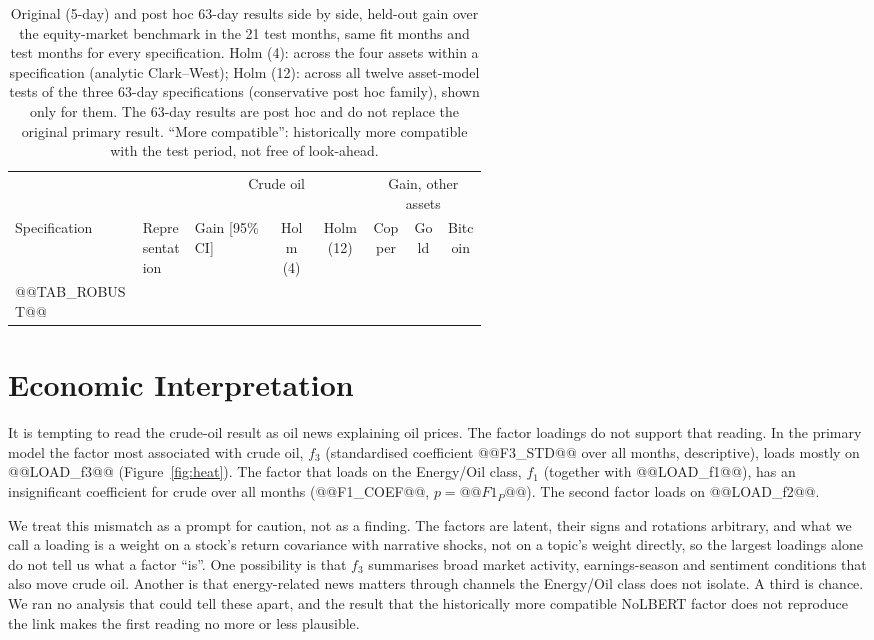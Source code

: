 \documentclass[11pt]{article}
\begin{document}
\begin{table}[t]
\centering\footnotesize
\begin{tabular}{@{}p{0.27\linewidth}p{0.11\linewidth}p{0.17\linewidth}ccccc@{}}
\toprule
 & & \multicolumn{3}{c}{Crude oil} & \multicolumn{3}{c}{Gain, other assets} \\
\cmidrule(lr){3-5}\cmidrule(l){6-8}
Specification & Representation & Gain [95\% CI] & Holm (4) & Holm (12) & Copper & Gold & Bitcoin \\
\midrule
@@TAB_ROBUST@@
\bottomrule
\end{tabular}
\caption{Original (5-day) and post hoc 63-day results side by side, held-out gain over the equity-market benchmark in the 21 test months, same fit months and test months for every specification. Holm (4): across the four assets within a specification (analytic Clark--West); Holm (12): across all twelve asset-model tests of the three 63-day specifications (conservative post hoc family), shown only for them. The 63-day results are post hoc and do not replace the original primary result. ``More compatible'': historically more compatible with the test period, not free of look-ahead.}
\label{tab:robust}
\end{table}

\section{Economic Interpretation}
\label{sec:interp}

It is tempting to read the crude-oil result as oil news explaining oil prices. The factor loadings do not support that reading. In the primary model the factor most associated with crude oil, $f_3$ (standardised coefficient @@F3_STD@@ over all months, descriptive), loads mostly on @@LOAD_f3@@ (Figure~\ref{fig:heat}). The factor that loads on the Energy/Oil class, $f_1$ (together with @@LOAD_f1@@), has an insignificant coefficient for crude over all months (@@F1_COEF@@, $p=@@F1_P@@$). The second factor loads on @@LOAD_f2@@.

We treat this mismatch as a prompt for caution, not as a finding. The factors are latent, their signs and rotations arbitrary, and what we call a loading is a weight on a stock's return covariance with narrative shocks, not on a topic's weight directly, so the largest loadings alone do not tell us what a factor ``is''. One possibility is that $f_3$ summarises broad market activity, earnings-season and sentiment conditions that also move crude oil. Another is that energy-related news matters through channels the Energy/Oil class does not isolate. A third is chance. We ran no analysis that could tell these apart, and the result that the historically more compatible NoLBERT factor does not reproduce the link makes the first reading no more or less plausible.
\end{document}

